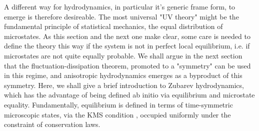\documentclass[12pt,onecolumn,showpacs,amssymb,aps,nofootinbib,floatfix]{revtex4-2}
\begin{document}
A different way for hydrodynamics, in particular it's generic frame form, to emerge is therefore desireable.
        The most universal "UV theory" might be the fundamental principle of statistical mechanics, the equal distribution of microstates.   As this section and the next one make clear, some care is needed to define the theory this way if the system is not in perfect local equilibrium, i.e. if microstates are not quite equally probable.  We shall argue in the next section that the fluctuation-dissipation theorem, promoted to a "symmetry" can be used in this regime, and anisotropic hydrodynamics emerges as a byproduct of this symmetry.    Here, we shall give a brief introduction to Zubarev hydrodynamics, which has the advantage of being defined ab initio via equilibrium and microstate equality. 
	Fundamentally, equilibrium is defined in terms of time-symmetric microscopic states, via the KMS condition \cite{kadanoff}, occupied uniformly under the constraint of conservation laws.\color{black}
	
\end{document}
